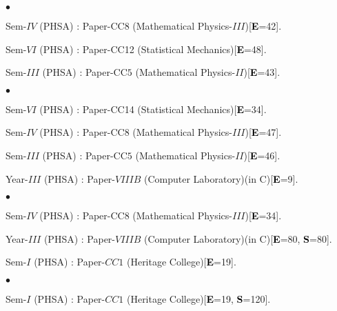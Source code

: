 \documentclass[margin,line]{res}
\newenvironment{list1}{
  \begin{list}{\ding{113}}{%
      \setlength{\itemsep}{0in}
      \setlength{\parsep}{0in} \setlength{\parskip}{0in}
      \setlength{\topsep}{0in} \setlength{\partopsep}{0in} 
      \setlength{\leftmargin}{0.17in}}}{\end{list}}
\newenvironment{list2}{
  \begin{list}{$\bullet$}{%
      \setlength{\itemsep}{0in}
      \setlength{\parsep}{0in} \setlength{\parskip}{0in}
      \setlength{\topsep}{0in} \setlength{\partopsep}{0in} 
      \setlength{\leftmargin}{0.2in}}}{\end{list}}
\begin{document}
\begin{resume}
\begin{list2}
\item Sem-$IV$ (PHSA) : Paper-CC8 (Mathematical Physics-$III$)[\textcolor{black}{\bf E}=42]. 
\item Sem-$VI$ (PHSA) : Paper-CC12 (Statistical Mechanics)[\textcolor{black}{\bf E}=48]. 
\item Sem-$III$ (PHSA) : Paper-CC$5$ (Mathematical Physics-$II$)[\textcolor{black}{\bf E}=43].
\end{list2}
\begin{list1}
\item[] \textcolor{iris}{}
\vspace{1mm}
\end{list1}
\begin{list2}
\item Sem-$VI$ (PHSA) : Paper-CC14 (Statistical Mechanics)[\textcolor{black}{\bf E}=34]. 
\item Sem-$IV$ (PHSA) : Paper-CC8 (Mathematical Physics-$III$)[\textcolor{black}{\bf E}=47]. 
\item Sem-$III$ (PHSA) : Paper-CC$5$ (Mathematical Physics-$II$)[\textcolor{black}{\bf E}=46]. 
\item Year-$III$ (PHSA) : Paper-$VIIIB$ (Computer Laboratory)(in C)[\textcolor{black}{\bf E}=9].
\end{list2}
\begin{list1}
\item[] \textcolor{iris}{}
\vspace{1mm}
\end{list1}
\begin{list2}
\item Sem-$IV$ (PHSA) : Paper-CC8 (Mathematical Physics-$III$)[\textcolor{black}{\bf E}=34]. 
\item Year-$III$ (PHSA) : Paper-$VIIIB$ (Computer Laboratory)(in C)[\textcolor{black}{\bf E}=80, \textcolor{black}{\bf S}=80]. 
\item Sem-$I$ (PHSA) : Paper-$CC1$ (Heritage College)[\textcolor{black}{\bf E}=19].
\end{list2}
\begin{list1}
\item[] \textcolor{iris}{}
\vspace{1mm}
\end{list1}
\begin{list2}
\item Sem-$I$ (PHSA) : Paper-$CC1$ (Heritage College)[\textcolor{black}{\bf E}=19, \textcolor{black}{\bf S}=120]. 
\end{list2}

\end{resume}
\end{document}
